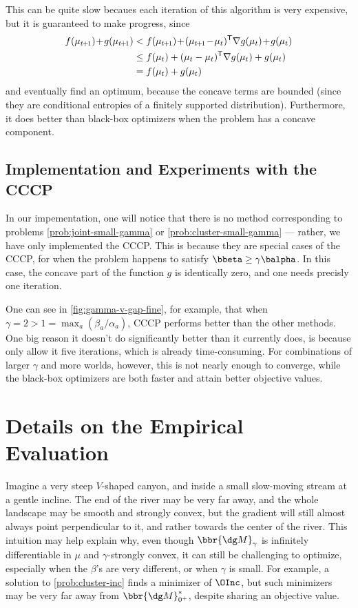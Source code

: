 This can be quite slow becaues each iteration of this algorithm is very expensive, but it is guaranteed to make progress, since
\def\tplus1{{t\mskip-2mu+\mskip-2mu1}}
\begin{align*}
    f(\mu_\tplus1) \!+\! g(\mu_\tplus1) &<  f(\mu_\tplus1) \!+\! (\mu_\tplus1 \!-\! \mu_t)^{\sf T} \nabla g(\mu_t) \!+\! g(\mu_t)
        \\
    &\le  f(\mu_t) + (\mu_t - \mu_{t})^{\sf T}\nabla g(\mu_t)  + g(\mu_t)
    \\
&= f(\mu_t) + g(\mu_t)
\end{align*}
and eventually find an optimum, because the concave terms are bounded (since they are conditional entropies of a finitely supported distribution).
Furthermore, it does better than black-box optimizers when the problem has a concave component.

\subsection{Implementation and Experiments with the CCCP}

In our impementation, one will notice that there is no 
method corresponding to problems \eqref{prob:joint-small-gamma} or \eqref{prob:cluster-small-gamma} --- rather, we have only implemented the CCCP. 
This is because they are special cases of the CCCP, for when the problem happens to satisfy $\bbeta \ge \gamma \balpha$. In this case, the concave part of the function $g$ is identically zero, and one needs precisly one iteration. 


One can see in \cref{fig:gamma-v-gap-fine}, for example, that when $\gamma = 2 > 1 = \max_a {(\beta_a / \alpha_a)}$, 
CCCP performs better than the other methods. One big reason it doesn't do significantly better than it currently does, is because only allow it five iterations, which is already time-consuming.
For combinations of larger $\gamma$ and more worlds, however, this is not nearly enough to converge, while the black-box optimizers are both faster and attain better objective values.

\section{Details on the Empirical Evaluation}\label{sec:expt-setup}
Imagine a very steep $V$-shaped canyon, and inside a small slow-moving stream at a gentle incline. The end of the river may be very far away, and the whole landscape may be smooth and strongly convex, but the gradient will still almost always point perpendicular to it, and rather towards the center of the river.
This intuition may help explain why, even though $\bbr{\dg M}_\gamma$ is infinitely differentiable in $\mu$ and $\gamma$-strongly convex, it can still be challenging to optimize, especially when the $\beta$'s are very different, or when $\gamma$ is small.
For example, a solution to \eqref{prob:cluster-inc} finds a minimizer of $\OInc$, but such minimizers may be very far away from $\bbr{\dg M}_{0^+}^*$, despite sharing an objective value.

